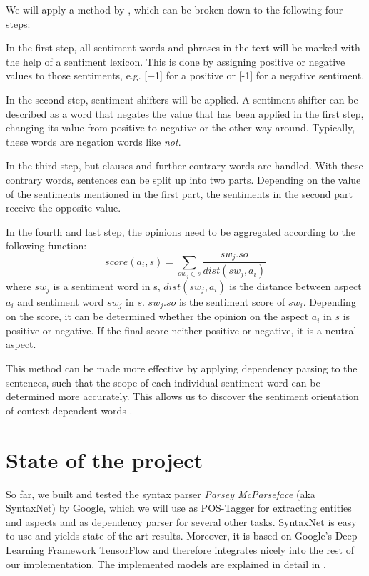 \documentclass[10pt,a4paper]{article}
\begin{document}
		We will apply a method by \cite{Ding:2008:HLA:1341531.1341561}, which can be broken down to the following four steps: 
		
		In the first step, all sentiment words and phrases in the text will be marked with the help of a sentiment lexicon. This is done by assigning positive or negative values to those sentiments, e.g. [+1] for a positive or [-1] for a negative sentiment.
		
		In the second step, sentiment shifters will be applied. A sentiment shifter can be described as a word that negates the value that has been applied in the first step, changing its value from positive to negative or the other way around. Typically, these words are negation words like \textit{not}. 
		
		In the third step, but-clauses and further contrary words are handled. With these contrary words, sentences can be split up into two parts. Depending on the value of the sentiments mentioned in the first part, the sentiments in the second part receive the opposite value.
		
		In the fourth and last step, the opinions need to be aggregated according to the following function:
		\begin{displaymath}
			score(a_i,s) = \sum_{ow_j \in s} \frac{sw_j.so}{dist(sw_j,a_i)}
		\end{displaymath}
		where $sw_j$ is a sentiment word in s, $dist(sw_j, a_i)$ is the distance between aspect $a_i$ and sentiment word $sw_j$ in $s$. $sw_j.so$ is the sentiment score of $sw_i$.  Depending on the score, it can be determined whether the opinion on the aspect $a_i$ in $s$ is positive or negative. If the final score neither positive or negative, it is a neutral aspect.
	
		This method can be made more effective by applying dependency parsing to the sentences, such that the scope of each individual sentiment word can be determined more accurately. This allows us to discover the sentiment orientation of context dependent words \cite{Liu12sentimentanalysis}.

	\section{State of the project}
	So far, we built and tested the syntax parser \textit{Parsey McParseface} (aka SyntaxNet) by Google, which we will use as POS-Tagger for extracting entities and aspects and as dependency parser for several other tasks. SyntaxNet is easy to use and yields state-of-the art results. Moreover, it is based on Google's Deep Learning Framework TensorFlow and therefore integrates nicely into the rest of our implementation. The implemented models are explained in detail in \cite{DBLP:journals/corr/AndorAWSPGPC16}.
	
\end{document}
